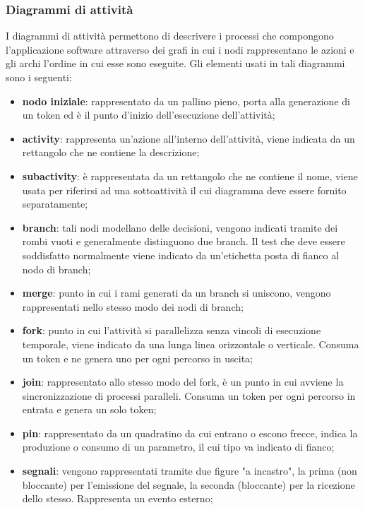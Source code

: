      	\subsubsection*{Diagrammi di attività}
     	I diagrammi di attività permettono di descrivere i processi che compongono l'applicazione software attraverso dei grafi in cui i nodi rappresentano le azioni e gli archi l'ordine in cui esse sono eseguite.
     	Gli elementi usati in tali diagrammi sono i seguenti: 
     	\begin{itemize}
     		\item{\textbf{nodo iniziale}}: rappresentato da un pallino pieno, porta alla generazione di un token ed è il punto d'inizio dell'esecuzione dell'attività; 
     		\item{\textbf{activity}}: rappresenta un'azione all'interno dell'attività, viene indicata  da un rettangolo che ne contiene la descrizione; 
     		\item{\textbf{subactivity}}: è rappresentata da un rettangolo che ne contiene il nome, viene usata per riferirsi ad una sottoattività il cui diagramma deve essere fornito separatamente; 
     		\item{\textbf{branch}}: tali nodi modellano delle decisioni, vengono indicati tramite dei rombi vuoti e generalmente distinguono due branch. Il test che deve essere soddisfatto normalmente viene indicato da un'etichetta posta di fianco al nodo di branch; 
     		\item{\textbf{merge}}: punto in cui i rami generati da un branch si uniscono, vengono rappresentati nello stesso modo dei nodi di branch; 
     		\item{\textbf{fork}}: punto in cui l'attività si parallelizza senza vincoli di esecuzione temporale, viene indicato da una lunga linea orizzontale o verticale. Consuma un token e ne genera uno per ogni percorso in uscita;  
     		\item{\textbf{join}}: rappresentato allo stesso modo del fork, è un punto in cui avviene la sincronizzazione di processi paralleli. Consuma un token per ogni percorso in entrata e genera un solo token; 
     		\item{\textbf{pin}}: rappresentato da un quadratino da cui entrano o escono frecce, indica la produzione o consumo di un parametro, il cui tipo va indicato di fianco;
     		\item{\textbf{segnali}}: vengono rappresentati tramite due figure "a incastro", la prima (non bloccante) per l'emissione del segnale, la seconda (bloccante) per la ricezione dello stesso. Rappresenta un evento esterno;

\end{itemize}
